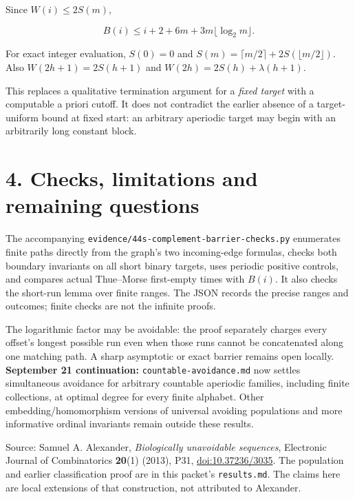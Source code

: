 \documentclass[
  11pt,
]{article}
\begin{document}
Since \(W(i)\le2S(m)\),

\[B(i)\le i+2+6m+3m\lfloor\log_2m\rfloor.\]

For exact integer evaluation, \(S(0)=0\) and
\(S(m)=\lceil m/2\rceil+2S(\lfloor m/2\rfloor)\). Also
\(W(2h+1)=2S(h+1)\) and \(W(2h)=2S(h)+\lambda(h+1)\).

This replaces a qualitative termination argument for a \emph{fixed
target} with a computable a priori cutoff. It does not contradict the
earlier absence of a target-uniform bound at fixed start: an arbitrary
aperiodic target may begin with an arbitrarily long constant block.

\section{4. Checks, limitations and remaining
questions}\label{checks-limitations-and-remaining-questions}

The accompanying \texttt{evidence/44s-complement-barrier-checks.py}
enumerates finite paths directly from the graph's two incoming-edge
formulas, checks both boundary invariants on all short binary targets,
uses periodic positive controls, and compares actual Thue--Morse
first-empty times with \(B(i)\). It also checks the short-run lemma over
finite ranges. The JSON records the precise ranges and outcomes; finite
checks are not the infinite proofs.

The logarithmic factor may be avoidable: the proof separately charges
every offset's longest possible run even when those runs cannot be
concatenated along one matching path. A sharp asymptotic or exact
barrier remains open locally. \textbf{September 21 continuation:}
\texttt{countable-avoidance.md} now settles simultaneous avoidance for
arbitrary countable aperiodic families, including finite collections, at
optimal degree for every finite alphabet. Other embedding/homomorphism
versions of universal avoiding populations and more informative ordinal
invariants remain outside these results.

Source: Samuel A. Alexander, \emph{Biologically unavoidable sequences},
Electronic Journal of Combinatorics \textbf{20}(1) (2013), P31,
\href{https://doi.org/10.37236/3035}{doi:10.37236/3035}. The population
and earlier classification proof are in this packet's
\texttt{results.md}. The claims here are local extensions of that
construction, not attributed to Alexander.
\end{document}
